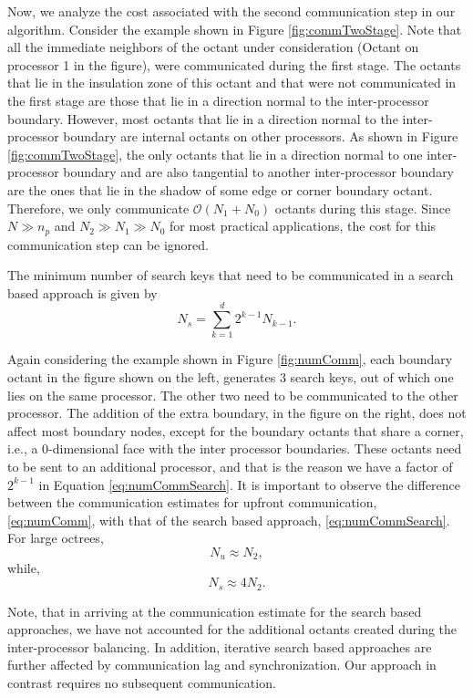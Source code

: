 Now, we analyze the cost associated with the second communication step
in our algorithm. Consider the example shown in Figure
\ref{fig:commTwoStage}. Note that all the immediate neighbors of the
octant under consideration (Octant on processor 1 in the figure), were
communicated during the first stage. The octants that lie in the
insulation zone of this octant and that were not communicated in the
first stage are those that lie in a direction normal to the
inter-processor boundary. However, most octants that lie in a
direction normal to the inter-processor boundary are internal octants
on other processors. As shown in Figure \ref{fig:commTwoStage}, the
only octants that lie in a direction normal to one inter-processor
boundary and are also tangential to another inter-processor boundary
are the ones that lie in the shadow of some edge or corner boundary
octant. Therefore, we only communicate $\mathcal{O}(N_1 + N_0)$
octants during this stage. Since $N\gg n_p$ and $N_2 \gg N_1 \gg N_0$
for most practical applications, the cost for this communication step
can be ignored.

The minimum number of search keys that need to be communicated in a
search based approach is given by
\begin{equation}
 \label{eq:numCommSearch}
 N_s = \sum_{k=1}^{d} 2^{k-1}N_{k-1}.
\end{equation}

Again considering the example shown in Figure \ref{fig:numComm}, each
boundary octant in the figure shown on the left, generates $3$ search
keys, out of which one lies on the same processor. The other two need
to be communicated to the other processor. The addition of the extra
boundary, in the figure on the right, does not affect most boundary
nodes, except for the boundary octants that share a corner, i.e., a
0-dimensional face with the inter processor boundaries.  These octants
need to be sent to an additional processor, and that is the reason we
have a factor of $2^{k-1}$ in Equation \ref{eq:numCommSearch}. It is
important to observe the difference between the communication
estimates for upfront communication, \ref{eq:numComm}, with that of
the search based approach, \ref{eq:numCommSearch}. For large octrees,
\[
N_u \approx N_2,
\]
while,
\[
N_s \approx 4N_2.
\]

Note, that in arriving at the communication estimate for the search
based approaches, we have not accounted for the additional octants
created during the inter-processor balancing. In addition, iterative
search based approaches are further affected by communication lag and
synchronization. Our approach in contrast requires no subsequent
communication.

